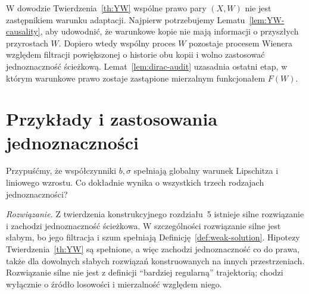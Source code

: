 \begin{uwaga}
W dowodzie Twierdzenia~\ref{th:YW} wspólne prawo pary
$(X,W)$ nie jest zastępnikiem warunku adaptacji.
Najpierw potrzebujemy Lematu~\ref{lem:YW-causality}, aby
udowodnić, że warunkowe kopie nie mają informacji o
przyszłych przyrostach $W$. Dopiero wtedy wspólny proces
$W$ pozostaje procesem Wienera względem filtracji
powiększonej o historie obu kopii i wolno zastosować
jednoznaczność ścieżkową. Lemat~\ref{lem:dirac-audit}
uzasadnia ostatni etap, w którym warunkowe prawo
zostaje zastąpione mierzalnym funkcjonałem $F(W)$.
\end{uwaga}

\section{Przykłady i zastosowania jednoznaczności}

\begin{zadanie}
Przypuśćmy, że współczynniki $b,\sigma$ spełniają
globalny warunek Lipschitza i liniowego wzrostu.
Co dokładnie wynika o wszystkich trzech rodzajach
jednoznaczności?

\emph{Rozwiązanie.} Z twierdzenia konstrukcyjnego
rozdziału~5 istnieje silne rozwiązanie i zachodzi
jednoznaczność ścieżkowa. W szczególności rozwiązanie
silne jest słabym, bo jego filtracja i szum spełniają
Definicję~\ref{def:weak-solution}. Hipotezy
Twierdzenia~\ref{th:YW} są spełnione, a więc zachodzi
jednoznaczność co do prawa, także dla dowolnych słabych
rozwiązań konstruowanych na innych przestrzeniach.
Rozwiązanie silne nie jest z definicji ``bardziej
regularną'' trajektorią; chodzi wyłącznie o źródło
losowości i mierzalność względem niego.
\end{zadanie}

